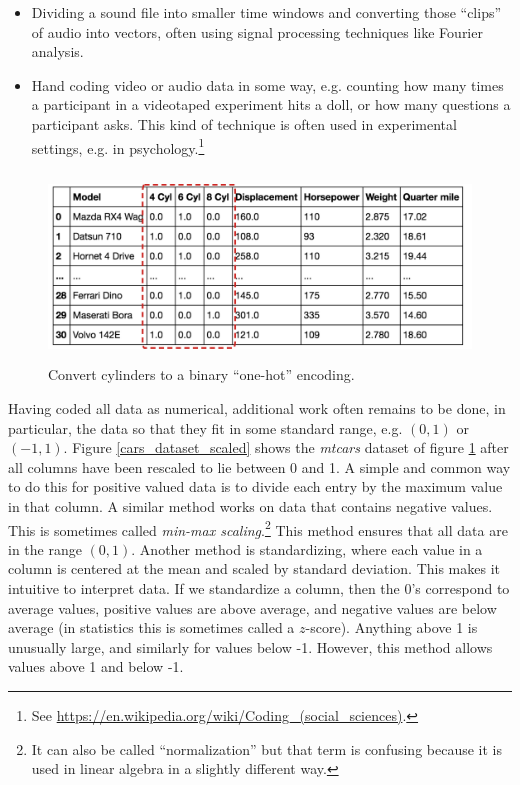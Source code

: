 \begin{itemize}
\item Dividing a sound file into smaller time windows and converting those ``clips'' of audio into vectors, often using signal processing techniques like Fourier analysis.
\item Hand coding video or audio data in some way, e.g. counting how many times a participant in a videotaped experiment hits a doll, or how many questions a participant asks. This kind of technique is often used in experimental settings, e.g. in psychology.\footnote{See \url{https://en.wikipedia.org/wiki/Coding_(social_sciences)}.}
\end{itemize}

\begin{figure}[h]
\centering
\includegraphics[height=50mm]{./images/CarsOneHot.png}
\caption[Screenshot of the Motor Trend Car Road Tests dataset included in R.]{Convert cylinders to a binary ``one-hot'' encoding.}
\label{cars_onehot}
\end{figure}

Having coded all data as numerical, additional work often remains to be done, in particular,  the data so that they fit in some standard range, e.g. $(0,1)$ or $(-1,1)$. Figure \ref{cars_dataset_scaled} shows the \emph{mtcars} dataset of figure \ref{cars_onehot} after all columns have been rescaled to lie between 0 and 1. A simple and common way to do this for positive valued data is to divide each entry by the maximum value in that column. A similar method works on data that contains negative values. This is sometimes called \emph{min-max scaling}.\footnote{It can also be called ``normalization'' but that term is confusing because it is used in linear algebra in a slightly different way.} This method ensures that all data are in the range  $(0,1)$. Another method is standardizing, where each value in a column is centered at the mean and scaled by standard deviation. This makes it intuitive to interpret data. If we standardize a column, then the 0's correspond to average values, positive values are above average, and negative values are below average (in statistics this is sometimes called a $z$-score). Anything above 1 is unusually large, and similarly for values below -1. However, this method allows values above 1 and below -1. 

